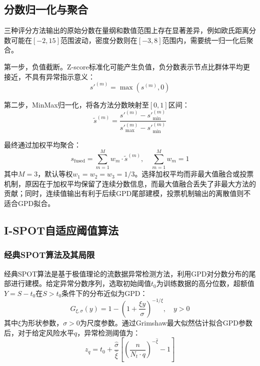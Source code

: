 \documentclass[10.5pt,a4paper,twocolumn]{ctexart}
\begin{document}
\subsection{分数归一化与聚合}

三种评分方法输出的原始分数在量纲和数值范围上存在显著差异，例如欧氏距离分数可能在$[-2, 15]$范围波动，密度分数则在$[-3, 8]$范围内，需要统一归一化后聚合。

第一步，负值截断。Z-score标准化可能产生负值，负分数表示节点比群体平均更接近，不具有异常指示意义：
\begin{equation}
    s'^{(m)} = \max(s^{(m)}, 0)
\end{equation}

第二步，MinMax归一化，将各方法分数映射至$[0, 1]$区间：
\begin{equation}
    \tilde{s}^{(m)} = \frac{s'^{(m)} - s'^{(m)}_{\min}}{s'^{(m)}_{\max} - s'^{(m)}_{\min}}
\end{equation}

最终通过加权平均聚合：
\begin{equation}\label{eq:fusion}
    s_{\text{fused}} = \sum_{m=1}^{M} w_m \cdot \tilde{s}^{(m)}, \quad \sum_{m=1}^{M} w_m = 1
\end{equation}
其中$M=3$，默认等权$w_1 = w_2 = w_3 = 1/3$。选择加权平均而非最大值融合或投票机制，原因在于加权平均保留了连续分数信息，而最大值融合丢失了非最大方法的贡献；同时，连续值输出有利于后续GPD尾部建模，投票机制输出的离散值则不适合GPD拟合。

\subsection{I-SPOT自适应阈值算法}

\subsubsection{经典SPOT算法及其局限}

经典SPOT\cite{siffer2017spot}算法是基于极值理论的流数据异常检测方法，利用GPD对分数分布的尾部进行建模。给定异常分数序列，选取初始阈值$t_0$为训练数据的高分位数，超额值$Y = S - t_0$在$S > t_0$条件下的分布近似为GPD：
\begin{equation}
    G_{\xi,\sigma}(y) = 1 - \left(1 + \frac{\xi y}{\sigma}\right)^{-1/\xi}, \quad y > 0
\end{equation}
其中$\xi$为形状参数，$\sigma > 0$为尺度参数。通过Grimshaw最大似然估计拟合GPD参数后，对于给定风险水平$q$，异常检测阈值为：
\begin{equation}\label{eq:spot_threshold}
    z_q = t_0 + \frac{\hat{\sigma}}{\hat{\xi}}\left[\left(\frac{n}{N_t \cdot q}\right)^{-\hat{\xi}} - 1\right]
\end{equation}
\end{document}
